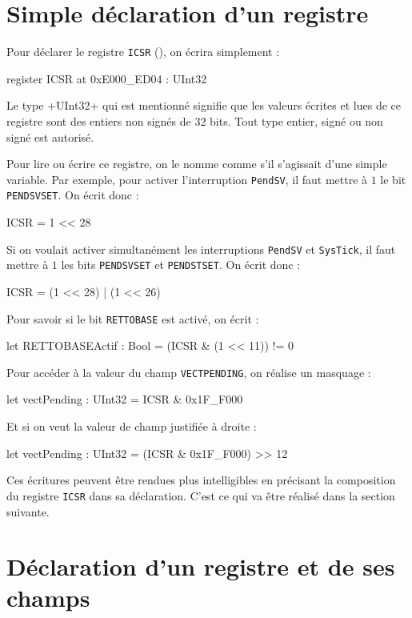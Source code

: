 \section{Simple déclaration d'un registre}
Pour déclarer le registre \texttt{ICSR} (), on écrira simplement :
\begin{PLM}
register ICSR at 0xE000_ED04 : UInt32
\end{PLM}

Le type \plm+UInt32+ qui est mentionné signifie que les valeurs écrites et lues de ce registre sont des entiers non signés de 32 bits. Tout type entier, signé ou non signé est autorisé.

Pour lire ou écrire ce registre, on le nomme comme s'il s'agissait d'une simple variable. Par exemple, pour activer l'interruption \texttt{PendSV}, il faut mettre à $1$ le bit \texttt{PENDSVSET}. On écrit donc :
\begin{PLM}
ICSR = 1 << 28
\end{PLM}

Si on voulait activer simultanément les interruptions \texttt{PendSV} et \texttt{SysTick}, il faut mettre à $1$ les bits \texttt{PENDSVSET} et \texttt{PENDSTSET}. On écrit donc :
\begin{PLM}
ICSR = (1 << 28) | (1 << 26)
\end{PLM}

Pour savoir si le bit \texttt{RETTOBASE} est activé, on écrit :
\begin{PLM}
let RETTOBASEActif : Bool = (ICSR & (1 << 11)) != 0
\end{PLM}

Pour accéder à la valeur du champ \texttt{VECTPENDING}, on réalise un masquage :
\begin{PLM}
let vectPending : UInt32 = ICSR & 0x1F_F000
\end{PLM}
 

Et si on veut la valeur de champ justifiée à droite :
\begin{PLM}
let vectPending : UInt32 = (ICSR & 0x1F_F000) >> 12
\end{PLM}
 
Ces écritures peuvent être rendues plus intelligibles en précisant la composition du registre \texttt{ICSR} dans sa déclaration. C'est ce qui va être réalisé dans la section suivante.


\section{Déclaration d'un registre et de ses champs}

